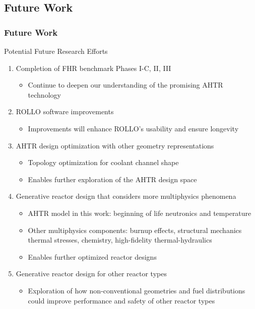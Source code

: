 \subsection{Future Work}
\begin{frame}
    \frametitle{Future Work}
    \vspace{-0.2cm}
    \begin{block}{Potential Future Research Efforts}
    \begin{enumerate}
        \item Completion of FHR benchmark Phases I-C, II, III
        \begin{itemize}
            \item Continue to deepen our understanding of the promising AHTR technology 
        \end{itemize}
        \item ROLLO software improvements 
            \begin{itemize}
                \item Improvements will enhance ROLLO's usability and ensure longevity
            \end{itemize}
        \item AHTR design optimization with other geometry representations 
            \begin{itemize}
                \item Topology optimization for coolant channel shape 
                \item Enables further exploration of the AHTR design space 
            \end{itemize}
        \item Generative reactor design that considers more multiphysics phenomena 
            \begin{itemize}
                \item AHTR model in this work: beginning of life neutronics and temperature 
                \item Other multiphysics components: burnup effects, structural mechanics 
                thermal stresses, chemistry, high-fidelity thermal-hydraulics 
                \item Enables further optimized reactor designs 
            \end{itemize}
        \item Generative reactor design for other reactor types
        \begin{itemize}
            \item Exploration of how non-conventional geometries and fuel distributions could 
            improve performance and safety of other reactor types 
        \end{itemize}
    \end{enumerate}
    \end{block}
\end{frame}